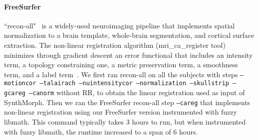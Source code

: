 \paragraph{FreeSurfer} ``recon-all"~\cite{fischl2002whole} is a widely-used neuroimaging pipeline that implements spatial normalization to a brain template, whole-brain segmentation, and cortical surface extraction. The non-linear registration algorithm (mri\_ca\_register tool) minimizes through gradient descent an error functional that includes an intensity term, a topology constraining one, a metric preservation term,  a smoothness term, and a label term~\cite{fischl2004sequence}.
We first ran recon-all on all the subjects with steps \texttt{--motioncor --talairach --nuintensitycor --normalization --skullstrip --gcareg --canorm} without RR, to obtain the linear registration used as input of SynthMorph. 
Then we ran the FreeSurfer recon-all step \texttt{--careg} that implements non-linear registration using our FreeSurfer version instrumented with fuzzy libmath. This command typically takes 3 hours to run, but when instrumented with fuzzy libmath, the runtime increased to a span of 6 hours.

